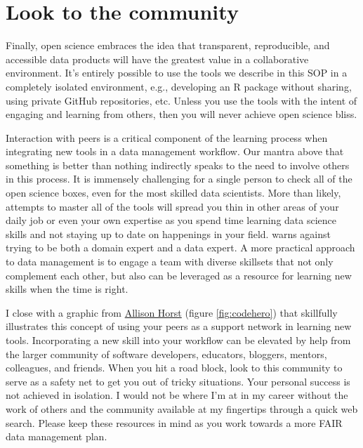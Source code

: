 \documentclass[
]{book}
\begin{document}
\section{Look to the community}\label{look-to-the-community}

Finally, open science embraces the idea that transparent, reproducible, and accessible data products will have the greatest value in a collaborative environment. It's entirely possible to use the tools we describe in this SOP in a completely isolated environment, e.g., developing an R package without sharing, using private GitHub repositories, etc. Unless you use the tools with the intent of engaging and learning from others, then you will never achieve open science bliss.

Interaction with peers is a critical component of the learning process when integrating new tools in a data management workflow. Our mantra above that something is better than nothing indirectly speaks to the need to involve others in this process. It is immensely challenging for a single person to check all of the open science boxes, even for the most skilled data scientists. More than likely, attempts to master all of the tools will spread you thin in other areas of your daily job or even your own expertise as you spend time learning data science skills and not staying up to date on happenings in your field. \citet{Mons18} warns against trying to be both a domain expert and a data expert. A more practical approach to data management is to engage a team with diverse skillsets that not only complement each other, but also can be leveraged as a resource for learning new skills when the time is right.

I close with a graphic from \href{https://twitter.com/allison_horst}{Allison Horst} (figure \ref{fig:codehero}) that skillfully illustrates this concept of using your peers as a support network in learning new tools. Incorporating a new skill into your workflow can be elevated by help from the larger community of software developers, educators, bloggers, mentors, colleagues, and friends. When you hit a road block, look to this community to serve as a safety net to get you out of tricky situations. Your personal success is not achieved in isolation. I would not be where I'm at in my career without the work of others and the community available at my fingertips through a quick web search. Please keep these resources in mind as you work towards a more FAIR data management plan.
\end{document}
